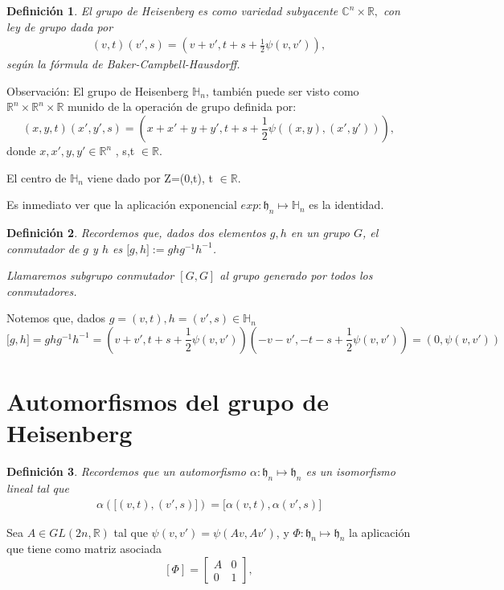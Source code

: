 \documentclass[12pt]{article}
\newtheorem{definition}{Definición}
\begin{document}
\begin{definition}
El grupo de Heisenberg es como variedad subyacente $\mathbb{C}^{n}\times \mathbb{R},$ con
ley de grupo dada por 
$$\begin{aligned}
(v,t)(v',s)=(v+v',t+s+ \frac{1}{2} \psi(v,v')),
\end{aligned}$$
según la fórmula de Baker-Campbell-Hausdorff.
\end{definition}

Observación:
 El grupo de Heisenberg $\mathbb{H}_n$, también puede ser visto como $\mathbb{R}^{n} \times \mathbb{R}^{n} \times \mathbb{R}$ munido
 de la operación de grupo definida por: 
 $$(x,y,t)(x',y',s)=(x+x'+y+y',t+s + \frac{1}{2} \psi((x,y),(x',y'))),$$
 donde $x,x',y,y' \in \mathbb{R}^{n}$ , s,t $\in \mathbb{R}$.




El centro de $\mathbb{H}_n$ viene dado por Z=(0,t), t $\in \mathbb{R}.$


Es inmediato ver que la aplicación exponencial $exp: \mathfrak{h}_n \mapsto \mathbb{H}_n$ es la identidad.
\begin{definition}
 Recordemos que, dados dos elementos $g,h$ en un grupo $G$, el conmutador de $g$ y $h$ es ${[}g,h{]}:=g h g^{-1} h^{-1}$.
 
 Llamaremos subgrupo conmutador $[G,G]$ al grupo generado por todos los conmutadores.
\end{definition}
Notemos que, dados $g=(v,t),h=(v',s) \in \mathbb{H}_n$
$$
{[}g,h{]}=g h g^{-1} h^{-1}=(v+v',t+s+\frac{1}{2}\psi(v,v')) (-v-v',-t-s + \frac{1}{2}\psi(v,v'))=(0,\psi(v,v'))
$$

\section{Automorfismos del grupo de Heisenberg}
\begin{definition}
 Recordemos que un automorfismo $\alpha: \mathfrak{h}_n \mapsto \mathfrak{h}_n$ es un isomorfismo lineal tal que 
 $$\begin{aligned}
    \alpha({[}(v,t),(v',s){]})={[}\alpha(v,t),\alpha(v',s){]}
 \end{aligned}$$
 

\end{definition}

Sea $A \in GL(2n,\mathbb{R})$ tal que  $\psi(v,v')=\psi(Av, Av')$, y  $\Phi:\mathfrak{h}_n \mapsto \mathfrak{h}_n$ la aplicación
que tiene como matriz asociada 
$$[\Phi] = 
\begin{bmatrix}
A & 0\\
0 & 1
\end{bmatrix},$$
\end{document}
